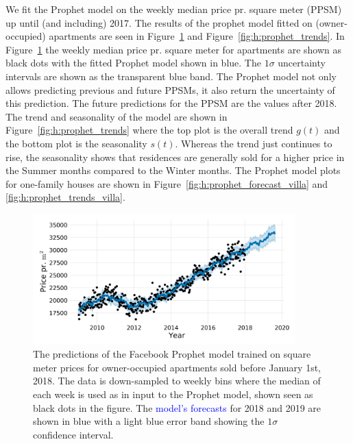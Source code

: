 We fit the Prophet model on the weekly median price pr. square meter (PPSM) up until (and including) \num{2017}. The results of the prophet model fitted on (owner-occupied) apartments are seen in Figure~\ref{fig:h:prophet_forecast} and Figure~\ref{fig:h:prophet_trends}. In Figure~\ref{fig:h:prophet_forecast} the weekly median price pr. square meter for apartments are shown as black dots with the fitted Prophet model shown in blue. The $1\sigma$ uncertainty intervals are shown as the transparent blue band. The Prophet model not only allows predicting previous and future PPSMs, it also return the uncertainty of this prediction. The future predictions for the PPSM are the values after 2018. The trend and seasonality of the model are shown in Figure~\ref{fig:h:prophet_trends} where the top plot is the overall trend $g(t)$ and the bottom plot is the seasonality $s(t)$. Whereas the trend just continues to rise, the seasonality shows that residences are generally sold for a higher price in the Summer months compared to the Winter months. 
The Prophet model plots for one-family houses are shown in Figure~\ref{fig:h:prophet_forecast_villa} and \ref{fig:h:prophet_trends_villa}. 

\begin{figure}
  \includegraphics[draft=false, width=0.9\textwidth, trim=15 15 15 15, clip]{figures/housing/Ejerlejlighed_v18_cut_all_Ncols_all_prophet_forecast.png}
  \caption[Prophet Forecast for Apartments]
          {The predictions of the Facebook Prophet model trained on square meter prices for owner-occupied apartments sold before January 1st, 2018. The data is down-sampled to weekly bins where the median of each week is used as in input to the Prophet model, shown seen as black dots in the figure. The \textcolor{blue}{model's forecasts} for 2018 and 2019 are shown in blue with a light blue error band showing the $1\sigma$ confidence interval.
          }
  \label{fig:h:prophet_forecast}
\end{figure}

